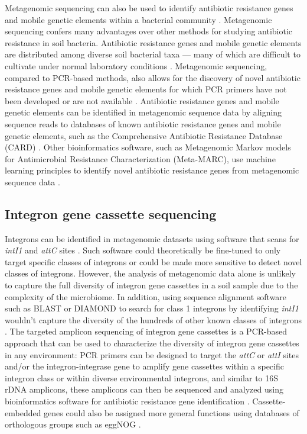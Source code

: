 Metagenomic sequencing can also be used to identify antibiotic resistance genes and mobile genetic elements within a bacterial community \parencite{Boolchandani.2019}.
Metagenomic sequencing confers many advantages over other methods for studying antibiotic resistance in soil bacteria.
Antibiotic resistance genes and mobile genetic elements are distributed among diverse soil bacterial taxa --- many of which are difficult to cultivate under normal laboratory conditions \parencite{Dunivin.2019}.
Metagenomic sequencing, compared to PCR-based methods, also allows for the discovery of novel antibiotic resistance genes and mobile genetic elements for which PCR primers have not been developed or are not available \parencite{Boolchandani.2019}.
Antibiotic resistance genes and mobile genetic elements can be identified in metagenomic sequence data by aligning sequence reads to databases of known antibiotic resistance genes and mobile genetic elements, such as the Comprehensive Antibiotic Resistance Database (CARD) \parencite{Alcock.2020}.
Other bioinformatics software, such as Metagenomic Markov models for Antimicrobial Resistance Characterization (Meta-MARC), use machine learning principles to identify novel antibiotic resistance genes from metagenomic sequence data \parencite{Lakin.2019}.

\subsection{Integron gene cassette sequencing}

Integrons can be identified in metagenomic datasets using software that scans for \textit{intI1} and \textit{attC} sites \parencite{Cury.2016}.
Such software could theoretically be fine-tuned to only target specific classes of integrons or could be made more sensitive to detect novel classes of integrons.
However, the analysis of metagenomic data alone is unlikely to capture the full diversity of integron gene cassettes in a soil sample due to the complexity of the microbiome.
In addition, using sequence alignment software such as BLAST or DIAMOND to search for class 1 integrons by identifying \textit{intI1} wouldn’t capture the diversity of the hundreds of other known classes of integrons \parencite{Altschul.1990, Buchfink.2015}.
The targeted amplicon sequencing of integron gene cassettes is a PCR-based approach that can be used to characterize the diversity of integron gene cassettes in any environment:
PCR primers can be designed to target the \textit{attC} or \textit{attI} sites and/or the integron-integrase gene to amplify gene cassettes within a specific integron class or within diverse environmental integrons, and similar to 16S rDNA amplicons, these amplicons can then be sequenced and analyzed using bioinformatics software for antibiotic resistance gene identification \parencite{Yang.2021, Ghaly.2019}.
Cassette-embedded genes could also be assigned more general functions using databases of orthologous groups such as eggNOG \parencite{HuertaCepas.2019}.

